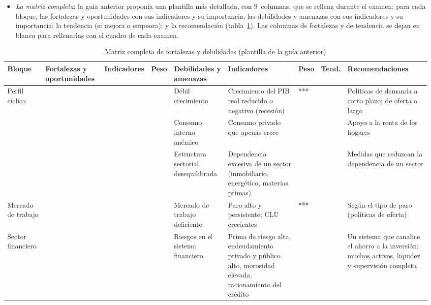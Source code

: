 \documentclass[11pt]{article}
\begin{document}
\begin{itemize}
\item \emph{La matriz completa}: la guía anterior proponía una plantilla más detallada, con 9~columnas, que se rellena durante el examen: para cada bloque, las fortalezas y oportunidades con sus indicadores y su importancia; las debilidades y amenazas con sus indicadores y su importancia; la tendencia (si mejora o empeora); y la recomendación (tabla~\ref{tab:matriz-completa}). Las columnas de fortalezas y de tendencia se dejan en blanco para rellenarlas con el cuadro de cada examen.
\end{itemize}

\begin{table}[H]
\centering\scriptsize
\setlength{\tabcolsep}{2.5pt}
\caption{Matriz completa de fortalezas y debilidades (plantilla de la guía anterior)}\label{tab:matriz-completa}
\begin{tabular}{>{\raggedright\arraybackslash}p{1.45cm}>{\raggedright\arraybackslash}p{1.6cm}>{\raggedright\arraybackslash}p{1.1cm}>{\centering\arraybackslash}p{0.62cm}>{\raggedright\arraybackslash}p{2.1cm}>{\raggedright\arraybackslash}p{2.9cm}>{\centering\arraybackslash}p{0.62cm}>{\centering\arraybackslash}p{0.8cm}>{\raggedright\arraybackslash}p{3.5cm}}
\toprule
\rowcolor{tceeazulpalido}
\textbf{Bloque} & \textbf{\textcolor{tceeverde}{Fortalezas y oportunidades}} & \textbf{Indica\-dores} & \textbf{Peso} & \textbf{\textcolor{tceerojo}{Debilidades y amenazas}} & \textbf{Indicadores} & \textbf{Peso} & \textbf{Tend.} & \textbf{Recomendaciones} \\
\midrule
Perfil cíclico & & & & Débil crecimiento & Crecimiento del PIB real reducido o negativo (recesión) & *** & & Políticas de demanda a corto plazo; de oferta a largo \\
 & & & & Consumo interno anémico & Consumo privado que apenas crece & & & Apoyo a la renta de los hogares \\
 & & & & Estructura sectorial desequilibrada & Dependencia excesiva de un sector (inmobiliario, energético, materias primas) & & & Medidas que reduzcan la dependencia de un sector \\
Mercado de trabajo & & & & Mercado de trabajo deficiente & Paro alto y persistente; CLU crecientes & *** & & Según el tipo de paro (políticas de oferta) \\
Sector financiero & & & & Riesgos en el sistema financiero & Prima de riesgo alta, endeudamiento privado y público alto, morosidad elevada, racionamiento del crédito & & & Un sistema que canalice el ahorro a la inversión: muchos activos, liquidez y supervisión completa \\

\end{tabular}
\end{table}
\end{document}
